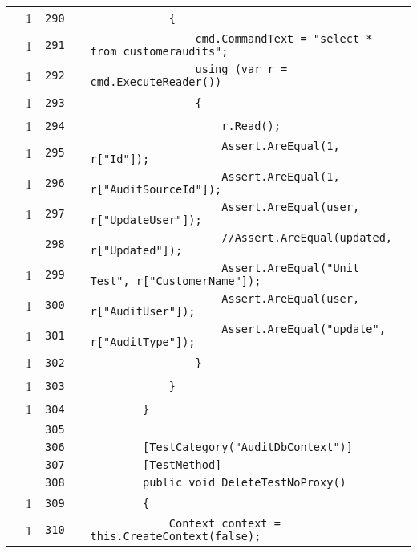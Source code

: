 \documentclass[a4paper,10pt]{article}
\begin{document}
\begin{longtable}[l]{lrrll}
\cellcolor{green} & 1 & \verb~290~ & & \verb~            {~\\
\cellcolor{green} & 1 & \verb~291~ & & \verb~                cmd.CommandText = "select * from customeraudits";~\\
\cellcolor{green} & 1 & \verb~292~ & & \verb~                using (var r = cmd.ExecuteReader())~\\
\cellcolor{green} & 1 & \verb~293~ & & \verb~                {~\\
\cellcolor{green} & 1 & \verb~294~ & & \verb~                    r.Read();~\\
\cellcolor{green} & 1 & \verb~295~ & & \verb~                    Assert.AreEqual(1, r["Id"]);~\\
\cellcolor{green} & 1 & \verb~296~ & & \verb~                    Assert.AreEqual(1, r["AuditSourceId"]);~\\
\cellcolor{green} & 1 & \verb~297~ & & \verb~                    Assert.AreEqual(user, r["UpdateUser"]);~\\
\cellcolor{gray} &  & \verb~298~ & & \verb~                    //Assert.AreEqual(updated, r["Updated"]);~\\
\cellcolor{green} & 1 & \verb~299~ & & \verb~                    Assert.AreEqual("Unit Test", r["CustomerName"]);~\\
\cellcolor{green} & 1 & \verb~300~ & & \verb~                    Assert.AreEqual(user, r["AuditUser"]);~\\
\cellcolor{green} & 1 & \verb~301~ & & \verb~                    Assert.AreEqual("update", r["AuditType"]);~\\
\cellcolor{green} & 1 & \verb~302~ & & \verb~                }~\\
\cellcolor{green} & 1 & \verb~303~ & & \verb~            }~\\
\cellcolor{green} & 1 & \verb~304~ & & \verb~        }~\\
\cellcolor{gray} &  & \verb~305~ & & \verb~~\\
\cellcolor{gray} &  & \verb~306~ & & \verb~        [TestCategory("AuditDbContext")]~\\
\cellcolor{gray} &  & \verb~307~ & & \verb~        [TestMethod]~\\
\cellcolor{gray} &  & \verb~308~ & & \verb~        public void DeleteTestNoProxy()~\\
\cellcolor{green} & 1 & \verb~309~ & & \verb~        {~\\
\cellcolor{green} & 1 & \verb~310~ & & \verb~            Context context = this.CreateContext(false);~\\

\end{longtable}
\end{document}
